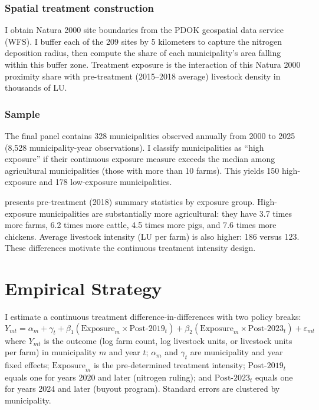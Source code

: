 \documentclass[12pt]{article}
\begin{document}
\subsubsection*{Spatial treatment construction} I obtain Natura 2000 site boundaries from the PDOK geospatial data service (WFS). I buffer each of the 209 sites by 5 kilometers to capture the nitrogen deposition radius, then compute the share of each municipality's area falling within this buffer zone. Treatment exposure is the interaction of this Natura 2000 proximity share with pre-treatment (2015--2018 average) livestock density in thousands of LU.

\subsubsection*{Sample} The final panel contains 328 municipalities observed annually from 2000 to 2025 (8,528 municipality-year observations). I classify municipalities as ``high exposure'' if their continuous exposure measure exceeds the median among agricultural municipalities (those with more than 10 farms). This yields 150 high-exposure and 178 low-exposure municipalities.



 presents pre-treatment (2018) summary statistics by exposure group. High-exposure municipalities are substantially more agricultural: they have 3.7 times more farms, 6.2 times more cattle, 4.5 times more pigs, and 7.6 times more chickens. Average livestock intensity (LU per farm) is also higher: 186 versus 123. These differences motivate the continuous treatment intensity design.


\section{Empirical Strategy}
\label{sec:strategy}

I estimate a continuous treatment difference-in-differences with two policy breaks:
\begin{equation}
\label{eq:main}
Y_{mt} = \alpha_m + \gamma_t + \beta_1 (\text{Exposure}_m \times \text{Post-2019}_t) + \beta_2 (\text{Exposure}_m \times \text{Post-2023}_t) + \varepsilon_{mt}
\end{equation}
where $Y_{mt}$ is the outcome (log farm count, log livestock units, or livestock units per farm) in municipality $m$ and year $t$; $\alpha_m$ and $\gamma_t$ are municipality and year fixed effects; $\text{Exposure}_m$ is the pre-determined treatment intensity; $\text{Post-2019}_t$ equals one for years 2020 and later (nitrogen ruling); and $\text{Post-2023}_t$ equals one for years 2024 and later (buyout program). Standard errors are clustered by municipality.
\end{document}
